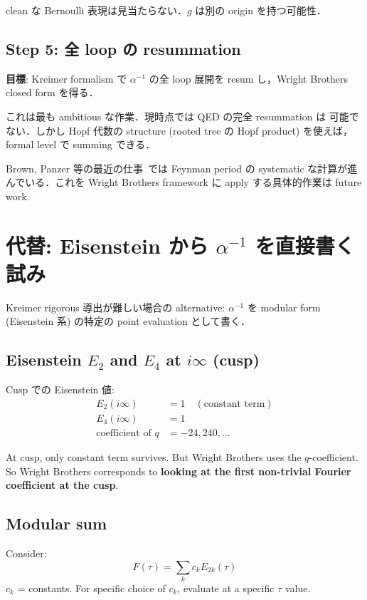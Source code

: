 \documentclass[11pt,a4paper]{article}
\begin{document}
clean な Bernoulli 表現は見当たらない．$g$ は別の origin を持つ可能性．

\subsection{Step 5: 全 loop の resummation}

\textbf{目標}: Kreimer formalism で $\alpha^{-1}$ の全 loop 展開を
resum し，Wright Brothers closed form を得る．

これは最も ambitious な作業．現時点では QED の完全 resummation は
可能でない．しかし Hopf 代数の structure (rooted tree の Hopf product)
を使えば，formal level で summing できる．

Brown, Panzer 等の最近の仕事~\cite{Brown2015, Panzer2015}では Feynman
period の systematic な計算が進んでいる．これを Wright Brothers
framework に apply する具体的作業は future work.

\section{代替: Eisenstein から $\alpha^{-1}$ を直接書く試み}

Kreimer rigorous 導出が難しい場合の alternative: $\alpha^{-1}$ を
modular form (Eisenstein 系) の特定の point evaluation として書く．

\subsection{Eisenstein $E_2$ and $E_4$ at $i\infty$ (cusp)}

Cusp での Eisenstein 値:
\begin{align}
E_2(i\infty) &= 1 \quad (\text{constant term})\\
E_4(i\infty) &= 1\\
\text{coefficient of } q &= -24, 240, \ldots
\end{align}

At cusp, only constant term survives. But Wright Brothers uses
the $q$-coefficient. So Wright Brothers corresponds to
\textbf{looking at the first non-trivial Fourier coefficient at the cusp}.

\subsection{Modular sum}

Consider:
\begin{equation}
F(\tau) = \sum_{k} c_k E_{2k}(\tau)
\end{equation}
$c_k$ = constants. For specific choice of $c_k$, evaluate at a specific
$\tau$ value.
\end{document}

